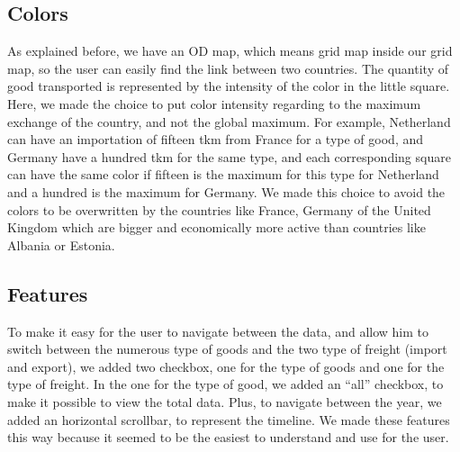 \documentclass{vgtc}
\begin{document}
\subsection{Colors}
As explained before, we have an OD map, which means grid map inside our grid map, so the user can easily find the link between two countries. The quantity of good transported is represented by the intensity of the color in the little square. Here, we made the choice to put color intensity regarding to the maximum exchange of the country, and not the global maximum. For example, Netherland can have an importation of fifteen tkm from France for a type of good, and Germany have a hundred tkm for the same type, and each corresponding square can have the same color if fifteen is the maximum for this type for Netherland and a hundred is the maximum for Germany. We made this choice to avoid the colors to be overwritten by the countries like France, Germany of the United Kingdom which are bigger and economically more active than countries like Albania or Estonia. 

\subsection{Features}
To make it easy for the user to navigate between the data, and allow him to switch between the numerous type of goods and the two type of freight (import and export), we added two checkbox, one for the type of goods and one for the type of freight. In the one for the type of good, we added an “all” checkbox, to make it possible to view the total data. Plus, to navigate between the year, we added an horizontal scrollbar, to represent the timeline. We made these features this way because it seemed to be the easiest to understand and use for the user. 
\end{document}
